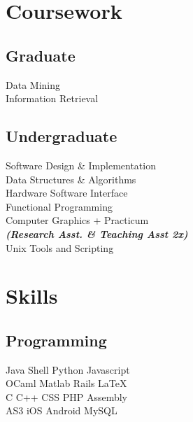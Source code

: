 \documentclass[]{deric-pang-resume}
\begin{document}
\begin{minipage}[t]{0.33\textwidth}
\section{Coursework}
\subsection{Graduate}
Data Mining \\
Information Retrieval \\
\sectionsep

\subsection{Undergraduate}
Software Design \& Implementation \\
Data Structures \& Algorithms \\
Hardware Software Interface \\
Functional Programming \\
Computer Graphics + Practicum \\
{\footnotesize \textit{\textbf{(Research Asst. \& Teaching Asst 2x) }}} \\
Unix Tools and Scripting \\


\section{Skills}
\subsection{Programming}
Java \textbullet{}   Shell \textbullet{} Python \textbullet{} Javascript \\
OCaml \textbullet{} Matlab \textbullet{} Rails \textbullet{} \LaTeX\ \\ 
C \textbullet{} C++ \textbullet{} CSS \textbullet{} PHP \textbullet{} Assembly \\
AS3 \textbullet{} iOS \textbullet{} Android \textbullet{} MySQL
\sectionsep

%
%

\end{minipage} 
\hfill
\end{document}
